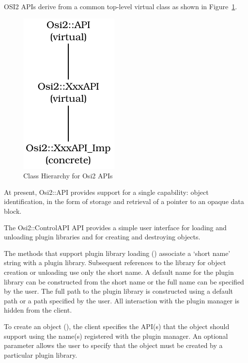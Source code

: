 \documentclass{article}
\newcommand{\OsiTwo}{OSI2\xspace}
\newcommand{\OsiTwoTop}{Osi2::API\xspace}
\newcommand{\OsiTwoControl}{Osi2::ControlAPI\xspace}
\begin{document}

\OsiTwo APIs derive from a common top-level virtual class  as
shown in Figure~\ref{fig:OsiTwoAPIHierarchy}.
\begin{figure}[b]
\begin{center}
\includegraphics{apihierarchy}
\end{center}
\caption{Class Hierarchy for Osi2 APIs}
\label{fig:OsiTwoAPIHierarchy}
\end{figure}

At present, \OsiTwoTop provides support for a single capability: object
identification, in the form of storage and retrieval of a pointer to an
opaque data block.

\subheading[l]{\OsiTwoControl}

The \OsiTwoControl API provides a simple user interface for loading and
unloading plugin libraries and for creating and destroying objects.

The methods that support plugin library loading () associate a
`short name' string with a plugin library.
Subsequent references to the library for object creation or unloading use
only the short name.
A default name for the plugin library can be constructed from the short name
or the full name can be specified by the user.
The full path to the plugin library is constructed using a default path or a
path specified by the user.
All interaction with the plugin manager is hidden from the client.

To create an object (),
the client specifies the API(s) that the object should
support using the name(s) registered with the plugin manager.
An optional parameter allows the user to specify that the object must be
created by a particular plugin library.
\end{document}
